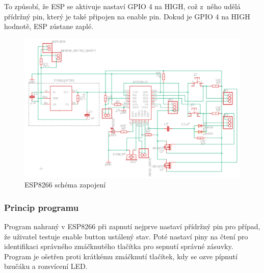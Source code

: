\documentclass[a4paper, 12pt]{report}
\begin{document}
    To způsobí, že ESP se aktivuje nastaví GPIO 4 na HIGH, což z~něho udělá přídržný pin, který je také připojen na enable pin. Dokud je GPIO 4 na HIGH hodnotě, ESP zůstane zaplé.
    \begin{figure}[h]
        \centering
        \includegraphics[width=12cm]{images/esp8266_schema}
        \caption{ESP8266 schéma zapojení}
        \label{fig:ESP8266_DPS}
    \end{figure}
    \subsubsection{Princip programu}
    Program nahraný v ESP8266 při zapnutí nejprve nastaví přídržný pin pro případ, že uživatel testuje enable button ustálený stav.
    Poté nastaví piny na čtení pro identifikaci správného zmáčknutého tlačítka pro sepnutí správné zásuvky.
    Program je ošetřen proti krátkému zmáčknutí tlačítek, kdy se ozve pípnutí bzučáku a rozsvícení LED\@.
\end{document}

